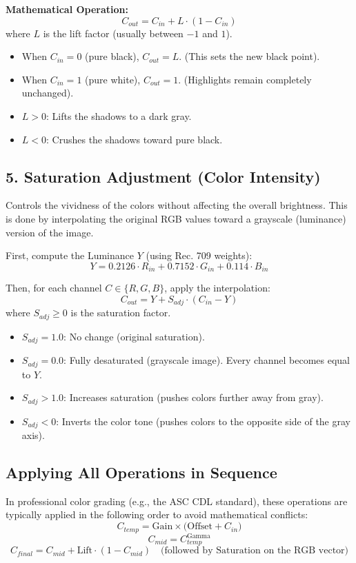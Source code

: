 \documentclass[UTF8]{ctexart}
\begin{document}
\textbf{Mathematical Operation:}
\begin{equation}
	C_{out} = C_{in} + L \cdot (1 - C_{in})
\end{equation}
where \( L \) is the lift factor (usually between \(-1\) and \(1\)).
\begin{itemize}
	\item When \( C_{in} = 0 \) (pure black), \( C_{out} = L \). (This sets the new black point).
	\item When \( C_{in} = 1 \) (pure white), \( C_{out} = 1 \). (Highlights remain completely unchanged).
	\item \( L > 0 \): Lifts the shadows to a dark gray.
	\item \( L < 0 \): Crushes the shadows toward pure black.
\end{itemize}

\subsection*{5. Saturation Adjustment (Color Intensity)}
Controls the vividness of the colors without affecting the overall brightness. This is done by interpolating the original RGB values toward a grayscale (luminance) version of the image.

First, compute the Luminance \( Y \) (using Rec. 709 weights):
\begin{equation}
	Y = 0.2126 \cdot R_{in} + 0.7152 \cdot G_{in} + 0.114 \cdot B_{in}
\end{equation}

Then, for each channel \( C \in \{R, G, B\} \), apply the interpolation:
\begin{equation}
	C_{out} = Y + S_{adj} \cdot (C_{in} - Y)
\end{equation}
where \( S_{adj} \ge 0 \) is the saturation factor.
\begin{itemize}
	\item \( S_{adj} = 1.0 \): No change (original saturation).
	\item \( S_{adj} = 0.0 \): Fully desaturated (grayscale image). Every channel becomes equal to \( Y \).
	\item \( S_{adj} > 1.0 \): Increases saturation (pushes colors further away from gray).
	\item \( S_{adj} < 0 \): Inverts the color tone (pushes colors to the opposite side of the gray axis).
\end{itemize}

\subsection*{Applying All Operations in Sequence}
In professional color grading (e.g., the ASC CDL standard), these operations are typically applied in the following order to avoid mathematical conflicts:
\[
C_{temp} = \text{Gain} \times \big( \text{Offset} + C_{in} \big)
\]
\[
C_{mid} = C_{temp}^{\text{Gamma}}
\]
\[
C_{final} = C_{mid} + \text{Lift} \cdot (1 - C_{mid}) \quad \text{(followed by Saturation on the RGB vector)}
\]
	
\end{document}
